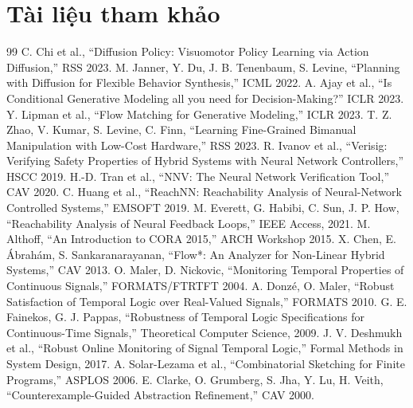 \documentclass[a4paper,12pt]{article}
\let\stdsection\section
\renewcommand{\section}{\clearpage\stdsection}
\begin{document}
\section*{Tài liệu tham khảo}
\begin{thebibliography}{99}
 C. Chi et al., ``Diffusion Policy: Visuomotor Policy Learning via Action Diffusion,'' RSS 2023.
 M. Janner, Y. Du, J. B. Tenenbaum, S. Levine, ``Planning with Diffusion for Flexible Behavior Synthesis,'' ICML 2022.
 A. Ajay et al., ``Is Conditional Generative Modeling all you need for Decision-Making?'' ICLR 2023.
 Y. Lipman et al., ``Flow Matching for Generative Modeling,'' ICLR 2023.
 T. Z. Zhao, V. Kumar, S. Levine, C. Finn, ``Learning Fine-Grained Bimanual Manipulation with Low-Cost Hardware,'' RSS 2023.
 R. Ivanov et al., ``Verisig: Verifying Safety Properties of Hybrid Systems with Neural Network Controllers,'' HSCC 2019.
 H.-D. Tran et al., ``NNV: The Neural Network Verification Tool,'' CAV 2020.
 C. Huang et al., ``ReachNN: Reachability Analysis of Neural-Network Controlled Systems,'' EMSOFT 2019.
 M. Everett, G. Habibi, C. Sun, J. P. How, ``Reachability Analysis of Neural Feedback Loops,'' IEEE Access, 2021.
 M. Althoff, ``An Introduction to CORA 2015,'' ARCH Workshop 2015.
 X. Chen, E. Ábrahám, S. Sankaranarayanan, ``Flow*: An Analyzer for Non-Linear Hybrid Systems,'' CAV 2013.
 O. Maler, D. Nickovic, ``Monitoring Temporal Properties of Continuous Signals,'' FORMATS/FTRTFT 2004.
 A. Donzé, O. Maler, ``Robust Satisfaction of Temporal Logic over Real-Valued Signals,'' FORMATS 2010.
 G. E. Fainekos, G. J. Pappas, ``Robustness of Temporal Logic Specifications for Continuous-Time Signals,'' Theoretical Computer Science, 2009.
 J. V. Deshmukh et al., ``Robust Online Monitoring of Signal Temporal Logic,'' Formal Methods in System Design, 2017.
 A. Solar-Lezama et al., ``Combinatorial Sketching for Finite Programs,'' ASPLOS 2006.
 E. Clarke, O. Grumberg, S. Jha, Y. Lu, H. Veith, ``Counterexample-Guided Abstraction Refinement,'' CAV 2000.

\end{thebibliography}
\end{document}
